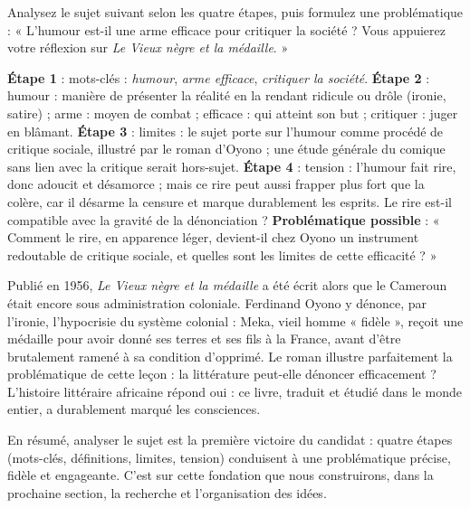 \documentclass[11pt]{article}
\begin{document}
\begin{exercice}
Analysez le sujet suivant selon les quatre étapes, puis formulez une problématique : « L'humour est-il une arme efficace pour critiquer la société ? Vous appuierez votre réflexion sur \emph{Le Vieux nègre et la médaille}. »
\end{exercice}

\begin{corrige}[Exercice 1]
\textbf{Étape 1} : mots-clés : \emph{humour}, \emph{arme efficace}, \emph{critiquer la société}. \textbf{Étape 2} : humour : manière de présenter la réalité en la rendant ridicule ou drôle (ironie, satire) ; arme : moyen de combat ; efficace : qui atteint son but ; critiquer : juger en blâmant. \textbf{Étape 3} : limites : le sujet porte sur l'humour comme procédé de critique sociale, illustré par le roman d'Oyono ; une étude générale du comique sans lien avec la critique serait hors-sujet. \textbf{Étape 4} : tension : l'humour fait rire, donc adoucit et désamorce ; mais ce rire peut aussi frapper plus fort que la colère, car il désarme la censure et marque durablement les esprits. Le rire est-il compatible avec la gravité de la dénonciation ? \textbf{Problématique possible} : « Comment le rire, en apparence léger, devient-il chez Oyono un instrument redoutable de critique sociale, et quelles sont les limites de cette efficacité ? »
\end{corrige}

\begin{savaistu}
Publié en 1956, \emph{Le Vieux nègre et la médaille} a été écrit alors que le Cameroun était encore sous administration coloniale. Ferdinand Oyono y dénonce, par l'ironie, l'hypocrisie du système colonial : Meka, vieil homme « fidèle », reçoit une médaille pour avoir donné ses terres et ses fils à la France, avant d'être brutalement ramené à sa condition d'opprimé. Le roman illustre parfaitement la problématique de cette leçon : la littérature peut-elle dénoncer efficacement ? L'histoire littéraire africaine répond oui : ce livre, traduit et étudié dans le monde entier, a durablement marqué les consciences.
\end{savaistu}

En résumé, analyser le sujet est la première victoire du candidat : quatre étapes (mots-clés, définitions, limites, tension) conduisent à une problématique précise, fidèle et engageante. C'est sur cette fondation que nous construirons, dans la prochaine section, la recherche et l'organisation des idées.
\end{document}
